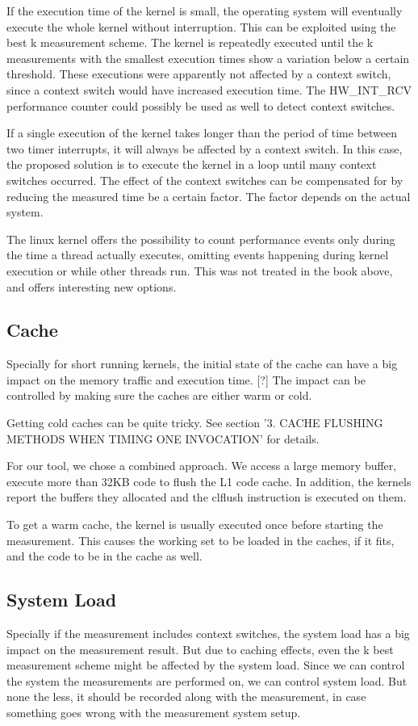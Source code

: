 \documentclass[a4paper,12pt]{article}
\begin{document}
If the execution time of the kernel is small, the operating system will
eventually execute the whole kernel without interruption. This can be exploited
using the best k measurement scheme. The kernel is repeatedly executed until the
k measurements with the smallest execution times show a variation below a
certain threshold. These executions were apparently not affected by a context
switch, since a context switch would have increased execution time. The
HW\_INT\_RCV performance counter could possibly be used as well to detect
context switches.

If a single execution of the kernel takes longer than the period of time between
two timer interrupts, it will always be affected by a context switch. In this
case, the proposed solution is to execute the kernel in a loop until many
context switches occurred. The effect of the context switches can be compensated
for by reducing the measured time be a certain factor. The factor depends on the
actual system.

The linux kernel offers the possibility to count performance events only during
the time a thread actually executes, omitting events happening during kernel
execution or while other threads run. This was not treated in the book above,
and offers interesting new options.

\subsection{Cache}
Specially for short running kernels, the initial state of the cache can have a
big impact on the memory traffic and execution time. [?] The impact can be
controlled by making sure the caches are either warm or cold.

Getting cold caches can be quite tricky. See
\cite{Whaley:2008:AAC:1462062.1462065} section '3.
CACHE FLUSHING METHODS WHEN TIMING ONE INVOCATION' for details.

For our tool, we chose a combined approach. We access a large memory buffer,
execute more than 32KB code to flush the L1 code cache. In addition, the kernels
report the buffers they allocated and the clflush instruction is executed on
them.

To get a warm cache, the kernel is usually executed once before starting the
measurement. This causes the working set to be loaded in the caches, if it fits,
and the code to be in the cache as well.

\subsection{System Load}
Specially if the measurement includes context switches, the system load has a
big impact on the measurement result. But due to caching effects, even the k
best measurement scheme might be affected by the system load. Since we can
control the system the measurements are performed on, we can control system
load. But none the less, it should be recorded along with the measurement, in
case something goes wrong with the measurement system setup.
\end{document}
